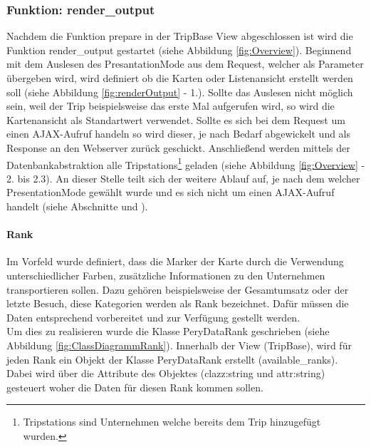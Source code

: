 \documentclass[Bachelorarbeit.tex]{subfiles}
\begin{document}
\subsubsection*{Funktion: render\_output}
\label{renderOutput}
Nachdem die Funktion prepare in der TripBase View abgeschlossen ist wird die Funktion render\_output gestartet (siehe Abbildung \ref{fig:Overview}).
Beginnend mit dem Auslesen des PresantationMode aus dem Request, welcher als Parameter übergeben wird, wird definiert ob die Karten oder Listenansicht erstellt werden soll (siehe Abbildung \ref{fig:renderOutput} - 1.).
Sollte das Auslesen nicht möglich sein, weil der Trip beispielsweise das erste Mal aufgerufen wird, so wird die Kartenansicht als Standartwert verwendet.
Sollte es sich bei dem Request um einen \ac{AJAX}-Aufruf handeln so wird dieser, je nach Bedarf abgewickelt und als Response an den Webserver zurück geschickt.
Anschließend werden mittels der Datenbankabstraktion alle Tripstations\footnote{Tripstations sind Unternehmen welche bereits dem Trip hinzugefügt wurden.} geladen (siehe Abbildung \ref{fig:Overview} - 2. bis 2.3).
An dieser Stelle teilt sich der weitere Ablauf auf, je nach dem welcher PresentationMode gewählt wurde und es sich nicht um einen \ac{AJAX}-Aufruf handelt (siehe Abschnitte  und ).\\


\paragraph{Rank}
\label{Rank}
Im Vorfeld wurde definiert, dass die Marker der Karte durch die Verwendung unterschiedlicher Farben, zusätzliche Informationen zu den Unternehmen transportieren sollen. 
Dazu gehören beispielsweise der Gesamtumsatz oder der letzte Besuch, diese Kategorien werden als Rank bezeichnet.
Dafür müssen die Daten entsprechend vorbereitet und zur Verfügung gestellt werden.
\\
Um dies zu realisieren wurde die Klasse PeryDataRank geschrieben (siehe Abbildung \ref{fig:ClassDiagrammRank}). 
Innerhalb der View (TripBase), wird für jeden Rank ein Objekt der Klasse PeryDataRank erstellt (available\_ranks).
Dabei wird über die Attribute des Objektes (clazz:string und attr:string) gesteuert woher die Daten für diesen Rank kommen sollen. \\

\end{document}
